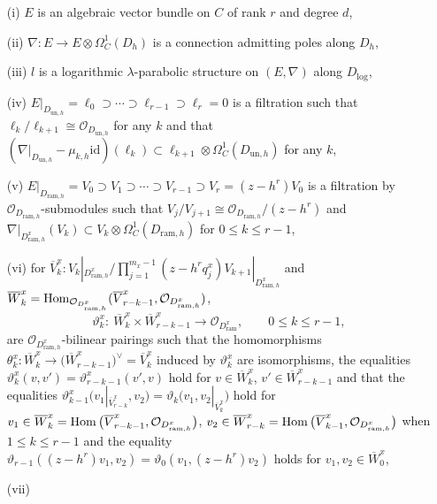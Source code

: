 \documentclass[pdftex]{sigma}
\numberwithin{equation}{section}
\newcommand\Hom{\mathop{\rm Hom}\nolimits}
\begin{document}
\begin{itemize}\itemsep=0pt
\item[(i)] $E$ is an algebraic vector bundle on $C$ of rank $r$ and degree $d$,
\item[(ii)] $\nabla\colon E\longrightarrow E\otimes\Omega^1_C(D_h)$
is a connection admitting poles along $D_h$,
\item[(iii)] $l$ is a logarithmic $\lambda$-parabolic structure on $(E,\nabla)$
along $D_{\mathrm{log}}$,
\item[(iv)] $E|_{D_{\mathrm{un},h}}=\ell_0\supset\cdots\supset \ell_{r-1}\supset\ell_r=0$
is a filtration
such that
$\ell_k/\ell_{k+1}\cong{\mathcal O}_{D_{\mathrm{un},h}}$ for any $k$
and that
$(\nabla|_{D_{\mathrm{un},h}}-\mu_{k,h}\mathrm{id})(\ell_k)\subset
\ell_{k+1}\otimes\Omega^1_C(D_{\mathrm{un},h})$
for any $k$,
\item[(v)]
$E|_{D_{\mathrm{ram},h}}=V_0\supset V_1\supset\cdots\supset V_{r-1}\supset
V_r= (z-h^r)V_0$
is a filtration by ${\mathcal O}_{D_{\mathrm{ram},h}}$-submodules
such that $V_j/V_{j+1}\cong{\mathcal O}_{D_{\mathrm{ram},h}}/(z-h^r)$ and
$\nabla|_{D^x_{\mathrm{ram},h}}(V_k)\subset
V_k\otimes\Omega^1_C(D_{\mathrm{ram},h})$
for $0\leq k\leq r-1$,
\item[(vi)]
for
$\overline{V}^x_k:V_k|_{D^x_{\mathrm{ram},h}}
\big/\prod_{j=1}^{m_x-1}(z-h^rq^x_j)V_{k+1}|_{D^x_{\mathrm{ram},h}}$
and
$\overline{W}^x_k=\Hom_{{\mathcal O}_{D^x_{\mathrm{ram},h}}}
(\overline{V}^x_{r-k-1},{\mathcal O}_{D^x_{\mathrm{ram},h}})$,
\[
 \vartheta^x_k\colon \ \overline{W}^x_k\times\overline{W}^x_{r-k-1}
 \longrightarrow {\mathcal O}_{D^x_{\mathrm{ram}}},
 \qquad 0\leq k\leq r-1,
\]
are ${\mathcal O}_{D^x_{\mathrm{ram},h}}$-bilinear pairings
such that the homomorphisms
$\theta^x_k\colon \overline{W}^x_k\longrightarrow
\big(\overline{W}^x_{r-k-1}\big)^{\vee}=\overline{V}^x_k$
induced by $\vartheta^x_k$ are isomorphisms,
the equalities $\vartheta^x_k(v,v')=\vartheta^x_{r-k-1}(v',v)$
hold for $v\in \overline{W}^x_k$, $v'\in\overline{W}^x_{r-k-1}$
and that
the equalities
$\vartheta^x_{k-1}\big( v_1|_{\overline{V}^x_{r-k}},v_2 \big)
=\vartheta_k \big( v_1,v_2|_{\overline{V}^x_k} \big)$
hold for
$v_1\in \overline{W}^x_k=\Hom\big(\overline{V}^x_{r-k-1},{\mathcal O}_{D^x_{\mathrm{ram},h}}\big)$,
$v_2\in \overline{W}^x_{r-k}=\Hom\big(\overline{V}^x_{k-1},{\mathcal O}_{D^x_{\mathrm{ram},h}}\big)$
when $1\leq k\leq r-1$
and the equality
$\vartheta_{r-1}((z-h^r)v_1,v_2)=\vartheta_0(v_1,(z-h^r)v_2)$
holds for $v_1,v_2\in \overline{W}^x_0$,
\item[(vii)]

\end{itemize}
\end{document}

